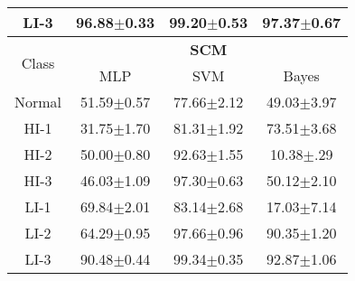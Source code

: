 \documentclass[review]{elsarticle}
\begin{document}
\begin{table}[!htb]
\begin{tabular}{c|ccc}
LI-3       & 96.88$\pm$0.33   & 99.20$\pm$0.53    & 97.37$\pm$0.67  \\
\hline
\hline
%
\multirow{2}{*}{Class} & \multicolumn{3}{c}{\textbf{SCM}} \\ 
\cline{2-4}
                       & MLP & SVM & Bayes 
                            \\ \hline           
Normal     & 51.59$\pm$0.57   & 77.66$\pm$2.12    & 49.03$\pm$3.97  \\  
HI-1       & 31.75$\pm$1.70   & 81.31$\pm$1.92    & 73.51$\pm$3.68  \\
HI-2       & 50.00$\pm$0.80   & 92.63$\pm$1.55    & 10.38$\pm$.29  \\
HI-3       & 46.03$\pm$1.09   & 97.30$\pm$0.63    & 50.12$\pm$2.10  \\ 
LI-1       & 69.84$\pm$2.01   & 83.14$\pm$2.68    & 17.03$\pm$7.14  \\ 
LI-2       & 64.29$\pm$0.95   & 97.66$\pm$0.96    & 90.35$\pm$1.20  \\ 
LI-3       & 90.48$\pm$0.44   & 99.34$\pm$0.35    & 92.87$\pm$1.06  \\
%
\hline
\bottomrule
\end{tabular}
 \label{tab:Class_ind}
\end{table} 
\end{document}
